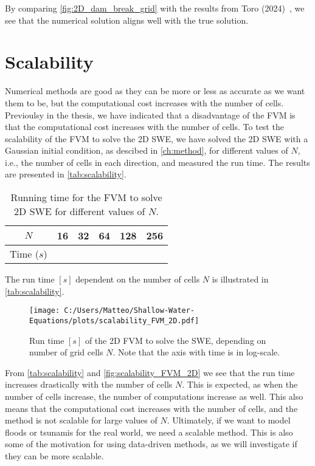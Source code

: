 By comparing \autoref{fig:2D_dam_break_grid} with the results from Toro (2024)~\cite{Toro2024}, we see that the numerical solution aligns well with the true solution.


\section{Scalability}\label{sec:scalability}
Numerical methods are good as they can be more or less as accurate as we want them to be, but the computational cost increases with the number of cells.
Previoulsy in the thesis, we have indicated that a disadvantage of the FVM is that the computational cost increases with the number of cells.
To test the scalability of the FVM to solve the 2D SWE, we have solved the 2D SWE with a Gaussian initial condition, as descibed in \autoref{ch:method}, for different values of $N$, i.e., the number of cells in each direction, and measured the run time.
The results are presented in \autoref{tab:scalability}.
\begin{table}[H]
    \centering
    \begin{tabular}{c|ccccc}
        \hline
        $N$ & 16 & 32 & 64 & 128 & 256 \\
        \hline 
        Time ($s$) & 
         &
         &
         &
         &
        
        \\
        \hline
    \end{tabular}
    \caption{Running time for the FVM to solve 2D SWE for different values of $N$.}\label{tab:scalability}
\end{table}
The run time $[s]$ dependent on the number of cells $N$ is illustrated in \autoref{tab:scalability}.
\begin{figure}[H]
    \centering
    \texttt{[image: C:/Users/Matteo/Shallow-Water-Equations/plots/scalability\_FVM\_2D.pdf]}
    \caption{Run time $[s]$ of the 2D FVM to solve the SWE, depending on number of grid cells $N$.
            Note that the axis with time is in log-scale.}\label{fig:scalability_FVM_2D}
\end{figure}
From \autoref{tab:scalability} and \autoref{fig:scalability_FVM_2D} we see that the run time increases drastically with the number of cells $N$.
This is expected, as when the number of cells increase, the number of computations increase as well.
This also means that the computational cost increases with the number of cells, and the method is not scalable for large values of $N$.
Ultimately, if we want to model floods or tsunamis for the real world, we need a scalable method.
This is also some of the motivation for using data-driven methods, as we will investigate if they can be more scalable.

